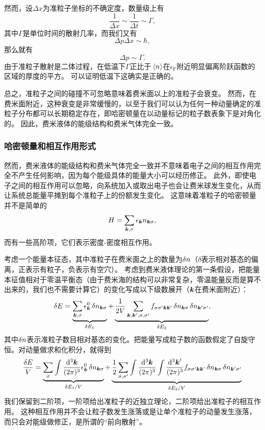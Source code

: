 然而，设$\Delta x$为准粒子坐标的不确定度，数量级上有
\[
    \frac{1}{\Delta x} \sim \frac{1}{\Delta t} \sim \Gamma,
\]
其中$\Gamma$是单位时间的散射几率，而我们又有
\[
    \Delta p \Delta x \sim \hbar,
\]
那么就有
\[
    \Delta p \sim \Gamma.
\]
由于准粒子散射是二体过程，在低温下$\Gamma$正比于$\expval*{{n}}$在$\epsilon_\text{F}$附近明显偏离阶跃函数的区域的厚度的平方。
可以证明低温下这确实是正确的。

总之，准粒子之间的碰撞不可忽略意味着费米面以上的准粒子会衰变。
然而，在费米面附近，这种衰变是非常缓慢的，以至于我们可以认为任何一种动量确定的准粒子分布都可以长期稳定存在，即哈密顿量在以动量标记的粒子数表象下是对角化的。
因此，费米液体的能级结构和费米气体完全一致。

\subsubsection{哈密顿量和相互作用形式}

然而，费米液体的能级结构和费米气体完全一致并不意味着电子之间的相互作用完全不产生任何影响，因为每个能级具体的能量大小可以经历修正。
此外，即使电子之间的相互作用可以忽略，向系统加入或取出电子也会让费米球发生变化，从而让系统总能量平摊到每个准粒子上的份额发生变化。
这意味着准粒子的哈密顿量并不是简单的
\[
    H = \sum_{\vb*{k}, \sigma} \epsilon_{\vb*{k}} n_{\vb*{k} \sigma},
\]
而有一些高阶项，它们表示密度-密度相互作用。

考虑一个能量本征态，其中准粒子在费米面之上的数量为$\var{n}$（$\delta$表示相对基态的偏离，正表示有粒子，负表示有空穴）。
考虑到费米液体理论的第一条假设，把能量本征值相对于零温平衡态（由于费米海的结构可以非常复杂，零温能量反而是算不出来的，我们也不需要计算它）的变化写成以下级数展开（$\vb*{k}$在费米面附近）：
\begin{equation}
    \var{E} = \underbrace{\sum_{\vb*{k}, \sigma} \epsilon^0_{\vb*{k}} \var{n_{\vb*{k} \sigma}}}_{\var{E_1}} + \underbrace{\frac{1}{2V} \sum_{\vb*{k}, \vb*{k}', \sigma, \sigma'} f_{\sigma \sigma' \vb*{k} \vb*{k}'} \var{n_{\vb*{k} \sigma}} \var{n_{\vb*{k}' \sigma'}}}_{\var{E_2}},
    \label{eq:fermi-liquid-energy}
\end{equation}
其中$\var{n}$表示准粒子数目相对基态的变化。把能量写成粒子数的函数假定了自旋守恒。对动量做求和化积分，就得到
\begin{equation}
    \frac{\var{E}}{V} = \underbrace{\sum_{\sigma} \int \frac{\dd[3]{\vb*{k}}}{(2\pi)^3} \epsilon^0_{\vb*{k}} \var{n_{\vb*{k} \sigma}}}_{\var{E_1} / V} + \underbrace{\frac{1}{2} \sum_{\sigma, \sigma'} \int \frac{\dd[3]{\vb*{k}}}{(2\pi)^3} \int \frac{\dd[3]{\vb*{k}'}}{(2\pi)^3} f_{\sigma \sigma' \vb*{k} \vb*{k}'} \var{n_{\vb*{k} \sigma}} \var{n_{\vb*{k}' \sigma'}}}_{\var{E_2} / V}
\end{equation}
我们保留到二阶项，一阶项给出准粒子的近独立理论，二阶项给出准粒子的相互作用。
这种相互作用并不会让粒子数发生涨落或是让单个准粒子的动量发生涨落，而只会对能级做修正，是所谓的“前向散射”。

